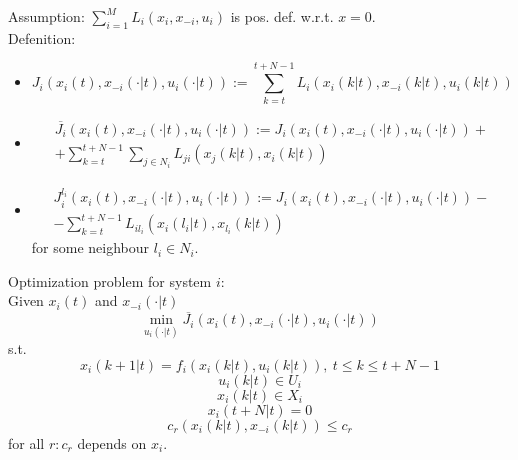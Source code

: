     Assumption: $\sum_{i=1}^M L_i(x_i,x_{-i},u_i)$ is pos. def. w.r.t. $x=0$.\\
    
    Defenition:
    \begin{itemize}
        \item    $$J_i(x_i(t),x_{-i}(\cdot|t),u_i(\cdot|t)) := \sum_{k=t}^{t+N-1} L_i(x_i(k|t),x_{-i}(k|t), u_i(k|t))$$
        \item 
            \begin{multline*} 
            \overline{J_i}(x_i(t),x_{-i}(\cdot|t),u_i(\cdot|t)) := J_i(x_i(t),x_{-i}(\cdot|t),u_i(\cdot|t)) + \\ + \sum_{k=t}^{t+N-1} \sum_{j \in N_i} L_{ji}(x_j(k|t),x_i(k|t))
            \end{multline*}
        \item 
            \begin{multline*}
            J_i^{l_i}(x_i(t),x_{-i}(\cdot|t),u_i(\cdot|t)) := J_i(x_i(t),x_{-i}(\cdot|t),u_i(\cdot|t)) - \\ - \sum_{k=t}^{t+N-1}L_{il_i}(x_i(l_i|t),x_{l_i}(k|t))
            \end{multline*}
            for some neighbour $l_i \in N_i$.
    \end{itemize}
    
    Optimization problem for system $i$:\\
    Given $x_i(t)$ and $x_{-i}(\cdot|t)$ \\
    \begin{equation}
        \min_{u_i(\cdot|t)} \overline{J_i}(x_i(t),x_{-i}(\cdot|t),u_i(\cdot|t))
    \end{equation}
    s.t. 
    $$x_i(k+1|t) = f_i(x_i(k|t),u_i(k|t)), \ t \le k \le t+N-1$$
    $$u_i(k|t) \in U_i$$
    $$x_i(k|t) \in X_i$$
    $$x_i(t+N|t) = 0$$
    $$c_r(x_i(k|t),x_{-i}(k|t)) \le c_r$$
    for all $r: c_r$ depends on $x_i$.\\
    
